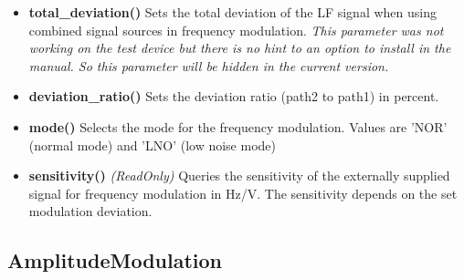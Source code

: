 \documentclass[11pt]{article} %
\begin{document}
\begin{itemize}
\begin{itemize}[]
	\end{itemize}
	{\it This parameter was not working on the test device but there is no hint to an option to install in the manual. So this parameter will be hidden in the current version.}
\item {\bf total\_deviation()} Sets the total deviation of the LF signal when using combined signal sources in frequency modulation.
	{\it This parameter was not working on the test device but there is no hint to an option to install in the manual. So this parameter will be hidden in the current version.}
\item {\bf deviation\_ratio()} Sets the deviation ratio (path2 to path1) in percent.
\item {\bf mode()} Selects the mode for the frequency modulation. Values are 'NOR' (normal mode) and 'LNO' (low noise mode)
\item {\bf sensitivity()} {\it (ReadOnly)} Queries the sensitivity of the externally supplied signal for frequency modulation in Hz/V. The sensitivity depends on the set modulation deviation.
\end{itemize}


\subsection{AmplitudeModulation}
\end{document}
